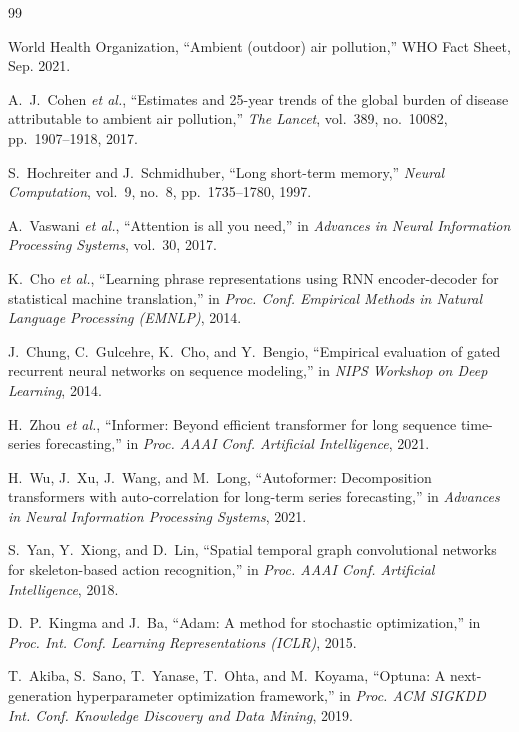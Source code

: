 \documentclass[conference]{IEEEtran}
\begin{document}
\begin{thebibliography}{99}

World Health Organization, ``Ambient (outdoor) air pollution,'' WHO Fact Sheet, Sep. 2021.

A.~J.~Cohen \textit{et al.}, ``Estimates and 25-year trends of the global burden of disease attributable to ambient air pollution,'' \textit{The Lancet}, vol.~389, no.~10082, pp.~1907--1918, 2017.

S.~Hochreiter and J.~Schmidhuber, ``Long short-term memory,'' \textit{Neural Computation}, vol.~9, no.~8, pp.~1735--1780, 1997.

A.~Vaswani \textit{et al.}, ``Attention is all you need,'' in \textit{Advances in Neural Information Processing Systems}, vol.~30, 2017.

K.~Cho \textit{et al.}, ``Learning phrase representations using RNN encoder-decoder for statistical machine translation,'' in \textit{Proc. Conf. Empirical Methods in Natural Language Processing (EMNLP)}, 2014.

J.~Chung, C.~Gulcehre, K.~Cho, and Y.~Bengio, ``Empirical evaluation of gated recurrent neural networks on sequence modeling,'' in \textit{NIPS Workshop on Deep Learning}, 2014.

H.~Zhou \textit{et al.}, ``Informer: Beyond efficient transformer for long sequence time-series forecasting,'' in \textit{Proc. AAAI Conf. Artificial Intelligence}, 2021.

H.~Wu, J.~Xu, J.~Wang, and M.~Long, ``Autoformer: Decomposition transformers with auto-correlation for long-term series forecasting,'' in \textit{Advances in Neural Information Processing Systems}, 2021.

S.~Yan, Y.~Xiong, and D.~Lin, ``Spatial temporal graph convolutional networks for skeleton-based action recognition,'' in \textit{Proc. AAAI Conf. Artificial Intelligence}, 2018.

D.~P.~Kingma and J.~Ba, ``Adam: A method for stochastic optimization,'' in \textit{Proc. Int. Conf. Learning Representations (ICLR)}, 2015.

T.~Akiba, S.~Sano, T.~Yanase, T.~Ohta, and M.~Koyama, ``Optuna: A next-generation hyperparameter optimization framework,'' in \textit{Proc. ACM SIGKDD Int. Conf. Knowledge Discovery and Data Mining}, 2019.


\end{thebibliography}
\end{document}
